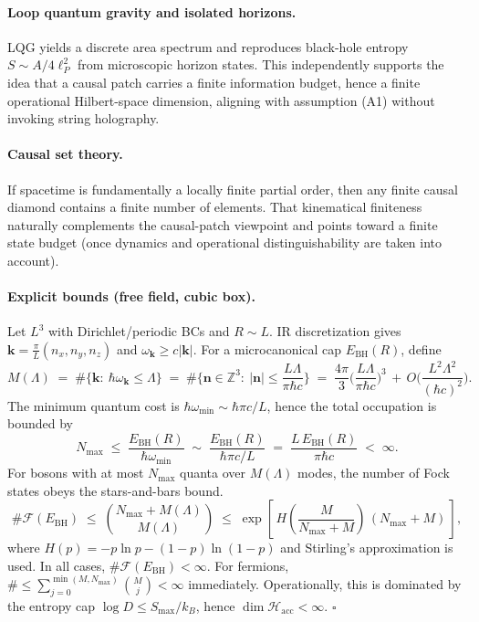 \documentclass[12pt]{article}
\newcommand{\Smax}{S_{\max}}
\theoremstyle{remark}
\begin{document}
\paragraph{Loop quantum gravity and isolated horizons.}
LQG yields a discrete area spectrum and reproduces black-hole entropy $S\!\sim\!A/4\ell_P^2$ from microscopic horizon states. This independently supports the idea that a causal patch carries a finite information budget, hence a finite operational Hilbert-space dimension, aligning with assumption (A1) without invoking string holography.

\paragraph{Causal set theory.}
If spacetime is fundamentally a locally finite partial order, then any finite causal diamond contains a finite number of elements. That kinematical finiteness naturally complements the causal-patch viewpoint and points toward a finite state budget (once dynamics and operational distinguishability are taken into account).

\paragraph{Explicit bounds (free field, cubic box).}
Let $L^3$ with Dirichlet/periodic BCs and $R\sim L$. IR discretization gives 
$\mathbf{k}=\frac{\pi}{L}(n_x,n_y,n_z)$ and $\omega_{\mathbf{k}}\ge c|\mathbf{k}|$.
For a microcanonical cap $E_{\mathrm{BH}}(R)$, define 
\[
M(\Lambda)\;=\;\#\{\mathbf{k}:\ \hbar\omega_{\mathbf{k}}\le \Lambda\}
\;=\;\#\Big\{\mathbf{n}\in\mathbb{Z}^3:\ |\mathbf{n}|\le \frac{L\Lambda}{\pi\hbar c}\Big\}
\;=\;\frac{4\pi}{3}\Big(\frac{L\Lambda}{\pi\hbar c}\Big)^3 \,+\,O\Big(\frac{L^2\Lambda^2}{(\hbar c)^2}\Big).
\]
The minimum quantum cost is $\hbar\omega_{\min}\sim \hbar\pi c/L$, hence the total occupation is bounded by
\[
N_{\max}\;\le\;\frac{E_{\mathrm{BH}}(R)}{\hbar\omega_{\min}}
\;\sim\;\frac{E_{\mathrm{BH}}(R)}{\hbar\pi c/L}
\;=\;\frac{L\,E_{\mathrm{BH}}(R)}{\pi\hbar c}\;<\;\infty.
\]
For bosons with at most $N_{\max}$ quanta over $M(\Lambda)$ modes, the number of Fock states obeys the stars-and-bars bound.
\[
\#\mathcal{F}(E_{\mathrm{BH}})\;\le\;\binom{N_{\max}+M(\Lambda)}{M(\Lambda)}
\;\le\;\exp\!\left[\,H\!\left(\frac{M}{N_{\max}+M}\right)\,(N_{\max}+M)\,\right],
\]
where $H(p)=-p\ln p-(1-p)\ln(1-p)$ and Stirling's approximation is used. In all cases, $\#\mathcal{F}(E_{\mathrm{BH}})<\infty$.
For fermions, $\#\le \sum_{j=0}^{\min(M,N_{\max})}\binom{M}{j}<\infty$ immediately.
Operationally, this is dominated by the entropy cap $\log D\le \Smax/k_B$, hence $\dim\mathcal{H}_{\mathrm{acc}}<\infty$.
\hfill$\square$
\end{document}
